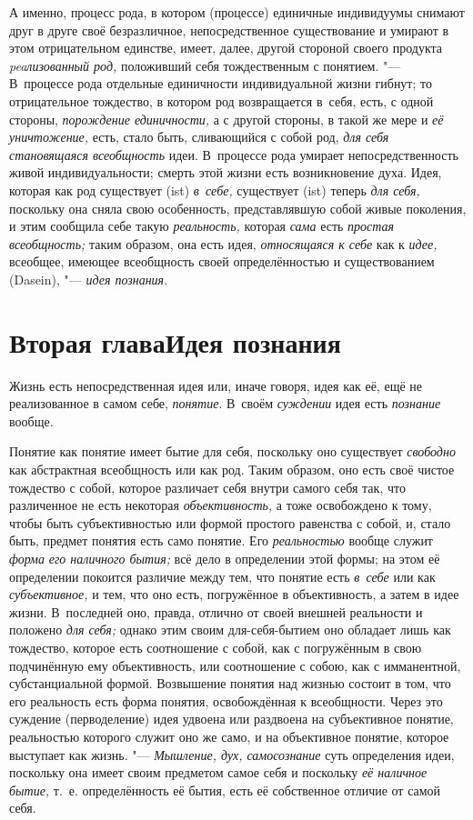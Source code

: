 А именно, процесс рода, в котором (процессе) единичные
индивидуумы снимают друг в друге своё безразличное, непосредственное
существование и умирают в этом отрицательном единстве, имеет, далее, другой
стороной своего продукта {\em peaлизованный род,}
положивший себя тождественным с понятием. "--- В~процессе рода
отдельные единичности индивидуальной жизни гибнут; то
отрицательное тождество, в котором род возвращается в~себя, есть, с одной
стороны, {\em порождение единичности,}
а с другой стороны, в такой же мере и {\em её уничтожение,}
есть, стало быть, сливающийся с собой род,
{\em для себя становящаяся всеобщность}
идеи. В~процессе рода умирает непосредственность живой
индивидуальности; смерть этой жизни есть возникновение духа. Идея, которая
как род существует (ist) {\em в~себе,}
существует (ist) теперь {\em для себя,} поскольку
она сняла свою особенность, представлявшую собой живые поколения, и этим
сообщила себе такую {\em реальность,} которая {\em сама}
есть {\em простая всеобщность;} таким образом, она есть идея,
{\em относящаяся к себе} как к {\em идее,}
всеобщее, имеющее всеобщность своей определённостью и
существованием (Dasein), "--- {\em идея познания}.

\chapter[Вторая глава Идея познания]{Вторая глава\newline Идея познания}

Жизнь есть непосредственная идея или, иначе говоря, идея как
её, ещё не реализованное в самом себе, {\em понятие}. В~своём
{\em суждении} идея есть {\em познание} вообще.

Понятие как понятие имеет бытие для себя, поскольку оно
существует {\em свободно}
как абстрактная всеобщность или как род. Таким образом, оно
есть своё чистое тождество с собой, которое различает себя внутри самого
себя так, что различенное не есть некоторая {\em объективность,} а
тоже освобождено к тому, чтобы быть субъективностью или формой простого
равенства с собой, и, стало быть, предмет понятия есть само понятие. Его
{\em реальностью} вообще служит {\em форма} {\em его наличного бытия;}
всё дело в определении этой формы; на этом её определении
покоится различие между тем, что понятие есть
{\em в~себе} или как {\em субъективное,} и
тем, что оно есть, погружённое в объективность, а затем в идее жизни.
В~последней оно, правда, отлично от своей внешней реальности и положено
{\em для себя;} однако
этим своим для-себя-бытием оно обладает лишь как тождество, которое есть
соотношение с собой, как с погружённым в свою подчинённую ему
объективность, или соотношение с собою, как с имманентной, субстанциальной
формой. Возвышение понятия над жизнью состоит в том, что его реальность
есть форма понятия, освобождённая к всеобщности. Через это суждение
(перводеление) идея удвоена или раздвоена на субъективное понятие,
реальностью которого служит оно же само, и на объективное понятие, которое
выступает как жизнь. "--- {\em Мышление,
дух, самосознание} суть определения идеи, поскольку она
имеет своим предметом самое себя и поскольку
{\em её наличное бытие,}
т.~е. определённость её бытия, есть её собственное отличие от
самой себя.

